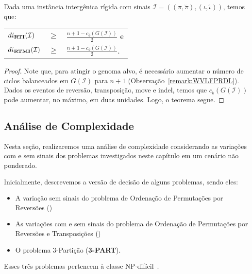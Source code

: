 \begin{theorem}\label{theorem:ZZBNVROM}
Dada uma instância intergênica rígida com sinais $\mathcal{I} = ((\pi,\breve\pi),(\iota,\breve\iota))$, temos que:

\begin{tabular}{lll}
  $di_{\textbf{RTI}}(\mathcal{I})$       & $ \ge $ & $\frac{{n + 1} - c_b(G(\mathcal{I}))}{2}$ e \\
  $di_{\textbf{RTMI}}(\mathcal{I})$    & $ \ge $ & $\frac{{n + 1} - c_b(G(\mathcal{I}))}{2}$.    \\
\end{tabular}
\end{theorem}
\begin{proof}
Note que, para atingir o genoma alvo, é necessário aumentar o número de ciclos balanceados em $G(\mathcal{I})$ para $n+1$ (Observação~\ref{remark:WVLFPRDL}). Dados os eventos de reversão, transposição, move e indel, temos que $c_b(G(\mathcal{I}))$ pode aumentar, no máximo, em duas unidades. Logo, o teorema segue.
\end{proof}

\subsection{Análise de Complexidade}

Nesta seção, realizaremos uma análise de complexidade considerando as variações com e sem sinais dos problemas investigados neste capítulo em um cenário não ponderado.

Inicialmente, descrevemos a versão de decisão de alguns problemas, sendo eles:
\begin{itemize}
  \item A variação sem sinais do problema de Ordenação de Permutações por Reversões (\SbR)
  \item As variações com e sem sinais do problema de Ordenação de Permutações por Reversões e Transposições (\SbRT)
  \item O problema $3$-Partição (\textbf{3-PART}).
\end{itemize}
Esses três problemas pertencem à classe NP-difícil~\cite{1999a-caprara,2019b-oliveira-etal,1990-garey-johnson}.

\begin{decision}
\end{decision}

